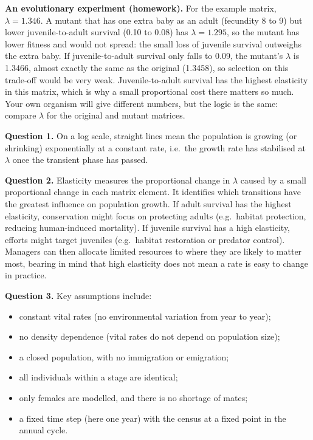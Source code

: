 \documentclass[
  a4paper]{book}
\providecommand{\tightlist}{%
  \setlength{\itemsep}{0pt}\setlength{\parskip}{0pt}}
\begin{document}
\textbf{An evolutionary experiment (homework).} For the example matrix, \(\lambda = 1.346\). A mutant that has one extra baby as an adult (fecundity 8 to 9) but lower juvenile-to-adult survival (0.10 to 0.08) has \(\lambda = 1.295\), so the mutant has lower fitness and would not spread: the small loss of juvenile survival outweighs the extra baby. If juvenile-to-adult survival only falls to 0.09, the mutant's \(\lambda\) is 1.3466, almost exactly the same as the original (1.3458), so selection on this trade-off would be very weak. Juvenile-to-adult survival has the highest elasticity in this matrix, which is why a small proportional cost there matters so much. Your own organism will give different numbers, but the logic is the same: compare \(\lambda\) for the original and mutant matrices.

\textbf{Question 1.} On a log scale, straight lines mean the population is growing (or shrinking) exponentially at a constant rate, i.e.~the growth rate has stabilised at \(\lambda\) once the transient phase has passed.

\textbf{Question 2.} Elasticity measures the proportional change in \(\lambda\) caused by a small proportional change in each matrix element. It identifies which transitions have the greatest influence on population growth. If adult survival has the highest elasticity, conservation might focus on protecting adults (e.g.~habitat protection, reducing human-induced mortality). If juvenile survival has a high elasticity, efforts might target juveniles (e.g.~habitat restoration or predator control). Managers can then allocate limited resources to where they are likely to matter most, bearing in mind that high elasticity does not mean a rate is easy to change in practice.

\textbf{Question 3.} Key assumptions include:

\begin{itemize}
\tightlist
\item
  constant vital rates (no environmental variation from year to year);
\item
  no density dependence (vital rates do not depend on population size);
\item
  a closed population, with no immigration or emigration;
\item
  all individuals within a stage are identical;
\item
  only females are modelled, and there is no shortage of mates;
\item
  a fixed time step (here one year) with the census at a fixed point in the annual cycle.
\end{itemize}
\end{document}
